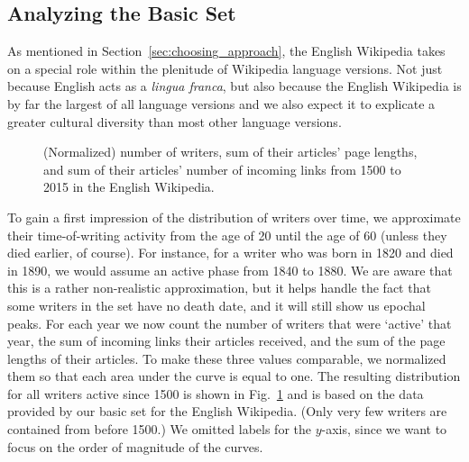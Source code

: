 \documentclass[a4paper,12pt]{scrartcl}
\begin{document}


\subsection{Analyzing the Basic Set}\label{sec:analyzing-basic-set}

As mentioned in Section~\ref{sec:choosing_approach},
%
%
the English Wikipedia takes on a special role within the plenitude of
Wikipedia language versions. Not just because English acts as a
\emph{lingua franca}, but also because the English Wikipedia is by far
the largest of all language versions and we also expect it to
explicate a greater cultural diversity than most other language
versions.
%

\begin{figure}
  \centering
  \caption{(Normalized) number of writers, sum of their articles'
    page lengths, and sum of their articles' number of incoming links
    from 1500 to 2015 in the English
    Wikipedia.}\label{fig:numbersEnglish}
\end{figure}

To gain a first impression of the distribution of writers over time,
we approximate their time-of-writing activity from the age of 20 until
the age of 60 (unless they died earlier, of course).
For instance, for a writer who was born in 1820 and died in 1890, we
would assume an active phase from 1840 to 1880.
%
We are aware that this is a rather non-realistic approximation, but it
helps handle the fact that some writers in the set have no death
date, and it will still show us epochal peaks.
%
%
%
For each year we now count the number of writers that were `active'
that year, the sum of incoming links their articles received, and the
sum of the page lengths of their articles. To make these three values
comparable, we normalized them so that each area under the curve is
equal to one.
%
The resulting distribution for all writers active since 1500 is shown
in Fig.~\ref{fig:numbersEnglish} and is based on the data provided by
our basic set for the English Wikipedia. %
(Only very few writers are contained from before 1500.) %
We omitted labels for the
$y$-axis, since we want to focus on the order of magnitude of the
curves.
\end{document}
